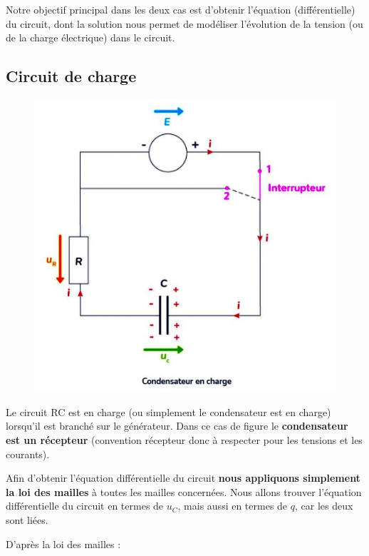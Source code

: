 \documentclass[11pt,a4paper]{article}
\begin{document}
Notre objectif principal dans les deux cas est d'obtenir l'équation (différentielle) du circuit, dont la solution nous permet de modéliser l'évolution de la tension (ou de la charge électrique) dans le circuit.

\subsection{Circuit de charge}

\begingroup
\setlength{\intextsep}{-15pt}%
\begin{figure}
  \centering\includegraphics[width=\linewidth]{imgs/p7/RCcharge.jpg}
\end{figure}

Le circuit RC est en charge (ou simplement le condensateur est en charge) lorsqu'il est branché sur le générateur. Dans ce cas de figure le \textbf{condensateur est un récepteur} (convention récepteur donc à respecter pour les tensions et les courants). 

Afin d'obtenir l'équation différentielle du circuit \textbf{nous appliquons simplement la loi des mailles} à toutes les mailles concernées. Nous allons trouver l'équation différentielle du circuit en termes de $u_C$, mais aussi en termes de $q$, car les deux sont liées. 

\endgroup
\vspace{.5cm}
D'après la loi des mailles : 
\end{document}
